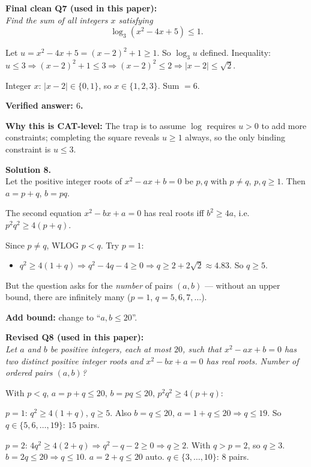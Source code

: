 \documentclass[11pt,a4paper]{article}
\newcommand{\shead}[1]{\vspace{0.5em}\noindent\textbf{Solution #1.}\\[0.15em]}
\begin{document}
\textbf{Final clean Q7 (used in this paper):}\\
\textit{Find the sum of all integers $x$ satisfying}
\[ \log_3(x^2 - 4x + 5) \le 1. \]

Let $u = x^2 - 4x + 5 = (x-2)^2 + 1 \ge 1$. So $\log_3 u$ defined.
Inequality: $u \le 3 \Rightarrow (x-2)^2 + 1 \le 3 \Rightarrow (x-2)^2 \le 2 \Rightarrow |x - 2| \le \sqrt{2}$.

Integer $x$: $|x - 2| \in \{0, 1\}$, so $x \in \{1, 2, 3\}$. Sum $= 6$.

\textbf{Verified answer: $6$.}

\textbf{Why this is CAT-level:} The trap is to assume $\log$ requires $u > 0$ to add more constraints; completing the square reveals $u \ge 1$ always, so the only binding constraint is $u \le 3$.

\shead{8}
Let the positive integer roots of $x^2 - ax + b = 0$ be $p, q$ with $p \ne q$, $p, q \ge 1$. Then $a = p + q$, $b = pq$.

The second equation $x^2 - bx + a = 0$ has real roots iff $b^2 \ge 4a$, i.e. $p^2q^2 \ge 4(p+q)$.

Since $p \ne q$, WLOG $p < q$. Try $p = 1$:
\begin{itemize}[leftmargin=1.2em,itemsep=0.1em]
    \item $q^2 \ge 4(1 + q) \Rightarrow q^2 - 4q - 4 \ge 0 \Rightarrow q \ge 2 + 2\sqrt{2} \approx 4.83$. So $q \ge 5$.
\end{itemize}
But the question asks for the \emph{number} of pairs $(a, b)$ — without an upper bound, there are infinitely many ($p=1$, $q = 5, 6, 7, \ldots$).

\textbf{Add bound:} change to ``$a, b \le 20$''.

\textbf{Revised Q8 (used in this paper):}\\
\textit{Let $a$ and $b$ be positive integers, each at most $20$, such that $x^2 - ax + b = 0$ has two distinct positive integer roots and $x^2 - bx + a = 0$ has real roots. Number of ordered pairs $(a, b)$?}

With $p < q$, $a = p+q \le 20$, $b = pq \le 20$, $p^2q^2 \ge 4(p+q)$:

$p = 1$: $q^2 \ge 4(1+q)$, $q \ge 5$. Also $b = q \le 20$, $a = 1 + q \le 20 \Rightarrow q \le 19$. So $q \in \{5,6,\ldots,19\}$: $15$ pairs.

$p = 2$: $4q^2 \ge 4(2+q) \Rightarrow q^2 - q - 2 \ge 0 \Rightarrow q \ge 2$. With $q > p = 2$, so $q \ge 3$. $b = 2q \le 20 \Rightarrow q \le 10$. $a = 2 + q \le 20$ auto. $q \in \{3,\ldots,10\}$: $8$ pairs.
\end{document}
